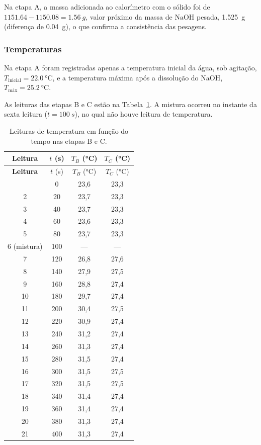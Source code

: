 Na etapa A, a massa adicionada ao calorímetro com o sólido foi de $\num{1151,64} - \num{1150,08} = \SI{1,56}{g}$, valor próximo da massa de $\mathrm{NaOH}$ pesada, \SI{1,525}{g} (diferença de \SI{0,04}{g}), o que confirma a consistência das pesagens.

\subsubsection{Temperaturas}

Na etapa A foram registradas apenas a temperatura inicial da água, sob agitação, $T_{\text{inicial}} = \SI{22,0}{\degreeCelsius}$, e a temperatura máxima após a dissolução do $\mathrm{NaOH}$, $T_{\text{máx}} = \SI{25,2}{\degreeCelsius}$.

As leituras das etapas B e C estão na Tabela~\ref{tab:temperaturas}. A mistura ocorreu no instante da sexta leitura ($t=\SI{100}{s}$), no qual não houve leitura de temperatura.

\begin{longtable}{cccc}
\caption{Leituras de temperatura em função do tempo nas etapas B e C.}\label{tab:temperaturas}\\
\toprule
\textbf{Leitura} & $t$ (s) & $T_B$ (\si{\degreeCelsius}) & $T_C$ (\si{\degreeCelsius})\\
\midrule
\endfirsthead
\toprule
\textbf{Leitura} & $t$ (s) & $T_B$ (\si{\degreeCelsius}) & $T_C$ (\si{\degreeCelsius})\\
\midrule
\endhead
\bottomrule
\endfoot
1 & 0 & 23,6 & 23,3\\
2 & 20 & 23,7 & 23,3\\
3 & 40 & 23,7 & 23,3\\
4 & 60 & 23,6 & 23,3\\
5 & 80 & 23,7 & 23,3\\
\midrule
6 (mistura) & 100 & --- & ---\\
\midrule
7 & 120 & 26,8 & 27,6\\
8 & 140 & 27,9 & 27,5\\
9 & 160 & 28,8 & 27,4\\
10 & 180 & 29,7 & 27,4\\
11 & 200 & 30,4 & 27,5\\
12 & 220 & 30,9 & 27,4\\
13 & 240 & 31,2 & 27,4\\
14 & 260 & 31,3 & 27,4\\
15 & 280 & 31,5 & 27,4\\
16 & 300 & 31,5 & 27,5\\
17 & 320 & 31,5 & 27,5\\
18 & 340 & 31,4 & 27,4\\
19 & 360 & 31,4 & 27,4\\
20 & 380 & 31,3 & 27,4\\
21 & 400 & 31,3 & 27,4\\
\end{longtable}

